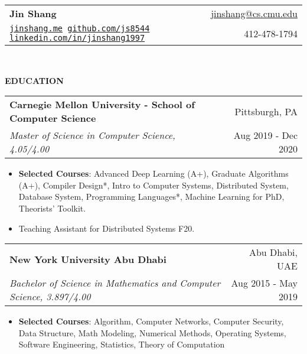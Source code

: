 \documentclass[letterpaper,11pt]{article}
\makeatletter
\newcommand{\resitem}[1]{\item  #1}
\newcommand{\resheading}[1]{{\large \colorbox{mygrey}{\begin{minipage}{\linewidth}{\textbf{#1 \vphantom{p\^{E}}}}\end{minipage}}}}
\newcommand{\ressubheading}[4]{
\begin{tabular*}{1.04\linewidth}{l@{\extracolsep{\fill}}r}
		\textbf{#1} & #2 \\
		\textit{#3} & #4 \\
\end{tabular*}\vspace{-6pt}}
\makeatother
\begin{document}
\newcommand{\mywebheader}{
\begin{tabular*}{7in}{l@{\extracolsep{\fill}}r}
	\textbf{{\LARGE Jin Shang}} & \href{mailto:jinshang@cs.cmu.edu}{jinshang@cs.cmu.edu}\\
	{\footnotesize \texttt{\href{https://jinshang.me}{jinshang.me} \hspace{1em} \href{https://github.com/js8544}{github.com/js8544} \hspace{1em} \href{https://linkedin.com/in/jinshang1997}{linkedin.com/in/jinshang1997}}}& 412-478-1794 \\
	\end{tabular*}
\\
\vspace{0.1in}}

\mywebheader

\resheading{EDUCATION}
	\begin{description}
		\item
			\ressubheading{Carnegie Mellon University - School of Computer Science}{Pittsburgh, PA}{Master of Science in Computer Science, 4.05/4.00} {Aug 2019 - Dec 2020}
			{ \footnotesize
				\begin{itemize}
					\resitem{\textbf{Selected Courses}: Advanced Deep Learning (A+), Graduate Algorithms (A+), Compiler Design*, Intro to Computer Systems, Distributed System, Database System, Programming Languages*, Machine Learning for PhD, Theorists' Toolkit.}
					\resitem{Teaching Assistant for Distributed Systems F20.}
				\end{itemize}
				}
		\item
			\ressubheading{New York University Abu Dhabi}{Abu Dhabi, UAE}{Bachelor of Science in Mathematics and Computer Science, 3.897/4.00} {Aug 2015 - May 2019}
				{ \footnotesize
				\begin{itemize}
					\resitem{\textbf{Selected Courses}: Algorithm, Computer Networks, Computer Security, Data Structure, Math Modeling, Numerical Methods, Operating Systems, Software Engineering, Statistics, Theory of Computation}
				\end{itemize}
				}
\begin{comment}
\end{comment}
	\end{description} %
\end{document}
